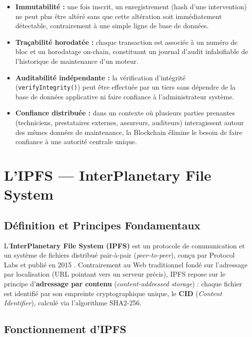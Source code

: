 \documentclass[12pt, a4paper, oneside]{report}
\begin{document}
\begin{itemize}
  \item \textbf{Immutabilité :} une fois inscrit, un enregistrement (hash d'une
  intervention) ne peut plus être altéré sans que cette
  altération soit immédiatement détectable, contrairement à une simple ligne de
  base de données.
  \item \textbf{Traçabilité horodatée :} chaque transaction est associée à un
  numéro de bloc et un horodatage on-chain, constituant un journal d'audit
  infalsifiable de l'historique de maintenance d'un moteur.
  \item \textbf{Auditabilité indépendante :} la vérification d'intégrité
  (\texttt{verifyIntegrity()}) peut être effectuée par un tiers sans dépendre de
  la base de données applicative ni faire confiance à l'administrateur système.
  \item \textbf{Confiance distribuée :} dans un contexte où plusieurs parties
  prenantes (techniciens, prestataires externes, assureurs, auditeurs)
  interagissent autour des mêmes données de maintenance, la Blockchain élimine le
  besoin de faire confiance à une autorité centrale unique.
\end{itemize}

\section{L'IPFS — InterPlanetary File System}

\subsection{Définition et Principes Fondamentaux}

L'\textbf{InterPlanetary File System (IPFS)} est un protocole de communication et un système
de fichiers distribué pair-à-pair (\textit{peer-to-peer}), conçu par Protocol Labs et publié
en 2015 \cite{ipfs}. Contrairement au Web traditionnel fondé sur l'adressage par localisation
(URL pointant vers un serveur précis), IPFS repose sur le principe d'\textbf{adressage par
contenu} (\textit{content-addressed storage}) : chaque fichier est identifié par son empreinte
cryptographique unique, le \textbf{CID} (\textit{Content Identifier}), calculé via l'algorithme
SHA2-256.

\subsection{Fonctionnement d'IPFS}
\end{document}
